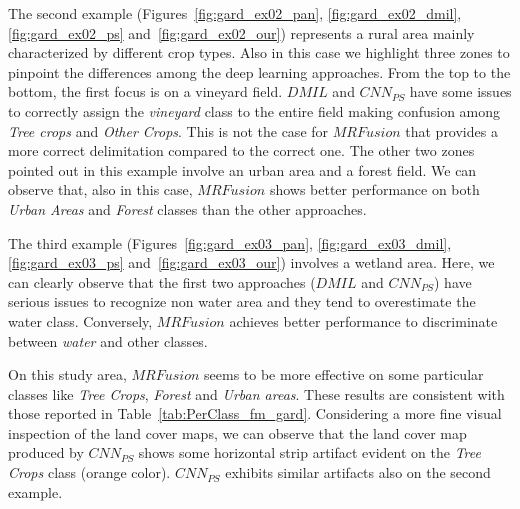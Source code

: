 \documentclass[journal]{IEEEtran}
\newcommand{\method}{$MRFusion$}
\begin{document}
The second example (Figures~\ref{fig:gard_ex02_pan}, \ref{fig:gard_ex02_dmil}, \ref{fig:gard_ex02_ps} and~\ref{fig:gard_ex02_our}) represents a rural area mainly characterized by different crop types. Also in this case we highlight three zones to pinpoint the differences among the deep learning approaches. From the top to the bottom, the first focus is on a vineyard field. $DMIL$ and $CNN_{PS}$ have some issues to correctly assign the \textit{vineyard} class to the entire field making confusion among \textit{Tree crops} and \textit{Other Crops}. This is not the case for \method{} that provides a more correct delimitation compared to the correct one. The other two zones pointed out in this example involve an urban area and a forest field. We can observe that, also in this case, \method{} shows better performance on both \textit{Urban Areas} and \textit{Forest} classes than the other approaches.

The third example (Figures~\ref{fig:gard_ex03_pan}, \ref{fig:gard_ex03_dmil}, \ref{fig:gard_ex03_ps} and~\ref{fig:gard_ex03_our}) involves a wetland area. Here, we can clearly observe that the first two approaches ($DMIL$ and $CNN_{PS}$) have serious issues to recognize non water area and they tend to overestimate the water class. Conversely, \method{} achieves better performance to discriminate between \textit{water} and other classes.

On this study area, \method{} seems to be more effective on some particular classes like \textit{Tree Crops}, \textit{Forest} and \textit{Urban areas}. These results are consistent with those reported in Table~\ref{tab:PerClass_fm_gard}.
Considering a more fine visual inspection of the land cover maps, we can observe that the land cover map produced by $CNN_{PS}$ shows some horizontal strip artifact evident on the \textit{Tree Crops} class (orange color). $CNN_{PS}$ exhibits similar artifacts also on the second example.
\end{document}
